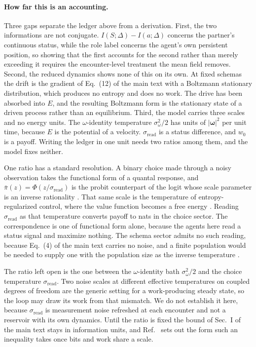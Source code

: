 \documentclass[
  aps,prx,
  preprint,
  superscriptaddress,
  nofootinbib
]{revtex4-2}
\newcommand{\w}{\bm{\omega}}
\newcommand{\sread}{\sigma_{\mathrm{read}}}
\newcommand{\sidn}{\sigma_{\omega}}
\newcommand{\pibar}{\bar\pi}
\begin{document}
\paragraph{How far this is an accounting.} Three gaps separate the ledger above from a derivation. First, the two informations are not conjugate. $I(S;\Delta)-I(a;\Delta)$ concerns the partner's continuous status, while the role label concerns the agent's own persistent position, so showing that the first accounts for the second rather than merely exceeding it requires the encounter-level treatment the mean field removes. Second, the reduced dynamics shows none of this on its own. At fixed schemas the drift is the gradient of Eq.~(12) of the main text with a Boltzmann stationary distribution, which produces no entropy and does no work. The drive has been absorbed into $E$, and the resulting Boltzmann form is the stationary state of a driven process rather than an equilibrium. Third, the model carries three scales and no energy units. The $\omega$-identity temperature $\sidn^2/2$ has units of $|\w|^2$ per unit time, because $E$ is the potential of a velocity. $\sread$ is a status difference, and $w_0$ is a payoff. Writing the ledger in one unit needs two ratios among them, and the model fixes neither.

One ratio has a standard resolution. A binary choice made through a noisy observation takes the functional form of a quantal response, and $\pibar(z)=\Phi(z/\sread)$ is the probit counterpart of the logit whose scale parameter is an inverse rationality \cite{mckelvey1995}. That same scale is the temperature of entropy-regularized control, where the value function becomes a free energy \cite{kappen2005,levine2018}. Reading $\sread$ as that temperature converts payoff to nats in the choice sector. The correspondence is one of functional form alone, because the agents here read a status signal and maximize nothing. The schema sector admits no such reading, because Eq.~(4) of the main text carries no noise, and a finite population would be needed to supply one with the population size as the inverse temperature \cite{sella2005}.

The ratio left open is the one between the $\omega$-identity bath $\sidn^2/2$ and the choice temperature $\sread$. Two noise scales at different effective temperatures on coupled degrees of freedom are the generic setting for a work-producing steady state, so the loop may draw its work from that mismatch. We do not establish it here, because $\sread$ is measurement noise refreshed at each encounter and not a reservoir with its own dynamics. Until the ratio is fixed the bound of Sec.~I of the main text stays in information units, and Ref.~\cite{still2012} sets out the form such an inequality takes once bits and work share a scale.
\end{document}
